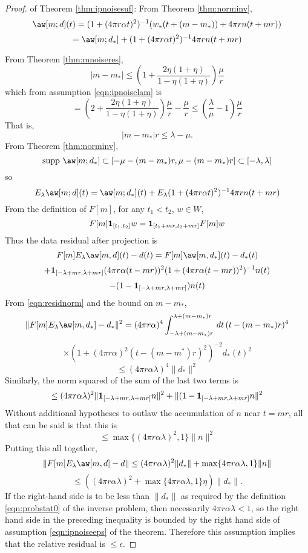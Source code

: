 \begin{proof} of Theorem \ref{thm:ipnoisesuf}:
From Theorem \ref{thm:norminv}, 
\[
  \aw[m;d](t) = (1+ (4 \pi r \alpha t)^2)^{-1}(w_*(t+(m-m_*)) + 4\pi r 
  n(t+mr)) 
\]
\[
  = \aw[m;d_*] + (1+ (4 \pi r \alpha t)^2)^{-1}4\pi r n(t+mr)
\]

From Theorem \ref{thm:mnoiseres},
\[
  |m-m_*| \le \left(1+\frac{2\eta(1+\eta)}{1-\eta(1+\eta)}\right)\frac{\mu}{r} 
\]
which from assumption \ref{eqn:ipnoiselam} is
\[
  =\left(2+\frac{2\eta(1+\eta)}{1-\eta(1+\eta)}\right)\frac{\mu}{r}
  -\frac{\mu}{r} \le \left(\frac{\lambda}{\mu}-1\right)\frac{\mu}{r}
\]
That is,
\[
  |m-m_*|r \le \lambda-\mu.
\]
From Theorem \ref{thm:norminv},
\[
  \mbox{supp }\aw[m;d_*] \subset [-\mu-(m-m_*)r, \mu-(m-m_*)r]
  \subset [-\lambda,\lambda]
\]
so
\[
  E_{\lambda}\aw[m;d](t) = \aw[m;d_*](t) + E_{\lambda}(1+ (4 \pi r \alpha
  t)^2)^{-1}4\pi r n(t+mr)
\]
From the definition of $F[m]$, for any $t_1<t_2$, $w \in W$,  
\[
  F[m]{\bf 1}_{[t_1.t_2]}w = {\bf 1}_{[t_1+mr,t_2+mr]}F[m]w  
\]
Thus the data residual after projection is
\[
  F[m]E_{\lambda}\aw[m,d](t) -d(t) = F[m]\aw[m,d_*](t) -d_*(t)  
\]
\[
  + {\bf 1}_{[-\lambda+mr,\lambda+mr]}(4 \pi r \alpha (t-mr))^2 (1+ (4 \pi
  r \alpha (t-mr))^2)^{-1} n(t)
\]
\[
  -(1- {\bf 1}_{[-\lambda+mr,\lambda+mr]})n(t)
\]
From \ref{eqn:residnorm} and the bound on $m-m_*$,
\[
  \| F[m]E_{\lambda}\aw[m,d_*] -d_*\|^2 = (4 \pi r \alpha)^4
  \int_{-\lambda+(m-m_*)r}^{\lambda+(m-m_*)r}\,dt\, (t-(m-m_*)r)^4
\]
\[
  \times (1+(4\pi r \alpha)^2 
  (t-(m-m^*)r)^2)^{-2}d_*(t)^2
\]
\[
  \le (4 \pi r \alpha \lambda)^4\|d_*\|^2
\]
Similarly, the norm squared of the sum of the last two terms is 
\[
  \le (4 \pi r \alpha \lambda)^2 \|{\bf 1}_{[-\lambda+mr,\lambda+mr]}
  n\|^2 + \|(1 - {\bf 1}_{[-\lambda+mr,\lambda+mr]}n\|^2
\]
Without additional hypotheses to outlaw the accumulation of $n$ near
$t=mr$, all that can be said is that this is
\[
  \le \max \{(4 \pi r \alpha \lambda)^2, 1\} \|n\|^2
\]
Putting this all together,
\[
  \|F[m]E_{\lambda}\aw[m,d]-d\| \le (4 \pi r \alpha
  \lambda)^2\|d_*\| + \max \{4\pi r \alpha \lambda, 1\}\|n\|
\]
\[
  \le ((4 \pi r \alpha \lambda)^2 +\max \{4\pi r \alpha \lambda, 1\}
  \eta)\|d_*\|.
\]
If the right-hand side is to be less than $\|d_*\|$ as required by the
definition \ref{eqn:probstat0} of the inverse problem, then
necessarily $4\pi r\alpha \lambda < 1$, so the right hand side in the
preceding inequality is bounded by the right hand side of assumption
\ref{eqn:ipnoiseeps} of the theorem. Therefore this assumption implies
that the relative residual is $\le \epsilon$.
\end{proof}

